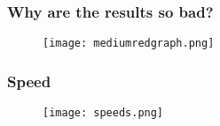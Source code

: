 \begin{frame}
\frametitle{Why are the results so bad?}
\begin{figure}

	\texttt{[image: mediumredgraph.png]}

\end{figure}
\end{frame}
\begin{frame}
\frametitle{Speed}
\begin{figure}

	\texttt{[image: speeds.png]}

\end{figure}
\end{frame}

